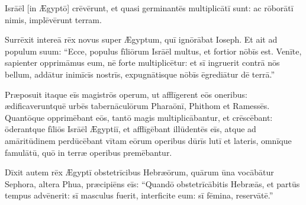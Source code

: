 
\thispagestyle{empty}


 Isrāēl [in Ægyptō] crēvērunt, et quasi germinantēs multiplicātī sunt:
ac rōborātī nimis, implēvērunt terram.

Surrēxit intereā rēx novus super Ægyptum, quī ignōrābat Ioseph.
Et ait ad populum suum: ``Ecce, populus fīliōrum Isrāēl multus, et fortior nōbīs est.
Venīte, sapien\-ter opprimāmus eum, nē forte multiplicētur: et sī ingruerit contrā nōs bellum, addātur inimīcīs nostrīs, expugnātisque nōbīs ēgrediātur dē terrā.''

Præposuit itaque eīs magistrōs operum, ut afflīgerent eōs oneribus: 
ædificaveruntquē urbēs tabernāculōrum Pharaōnī, Phithom et Ramessēs.
Quantōque opprimēbant eōs, tantō magis multiplicābantur, et crēscēbant: 
ōderantque fīliōs Isrāēl Ægyptiī, et afflīgēbant illūdentēs eīs,
atque ad amāritūdinem perdūcēbant vītam eōrum operibus dūrīs lutī et lateris, omnīque famulātū, quō in terræ operibus premēbantur. 

Dīxit autem rēx Ægyptī  obstetrīcibus Hebræōrum, quārum ūna vocābātur Sephora, altera Phua, 
 præcipiēns eīs: ``Quandō obstetrīcābitis Hebræās, et  partūs tempus advēnerit: sī masculus fuerit, interficite eum: sī fēmina, reservātē.''

